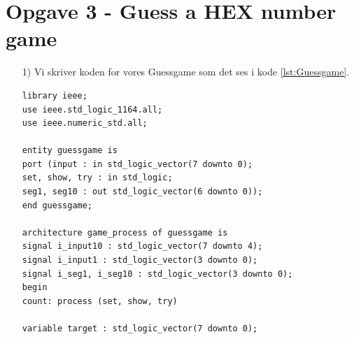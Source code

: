 
\section{Opgave 3 - Guess a HEX number game}
\begin{enumerate}
	\item[1)]
	Vi skriver koden for vores Guessgame som det ses i kode \ref{lst:Guessgame}.\\
	\begin{lstlisting}[caption={Behavioral style kode for Guessgame},label={lst:Guessgame}]
library ieee;
use ieee.std_logic_1164.all;
use ieee.numeric_std.all;

entity guessgame is 
port (input : in std_logic_vector(7 downto 0);
set, show, try : in std_logic;
seg1, seg10 : out std_logic_vector(6 downto 0));
end guessgame;

architecture game_process of guessgame is
signal i_input10 : std_logic_vector(7 downto 4);
signal i_input1 : std_logic_vector(3 downto 0);
signal i_seg1, i_seg10 : std_logic_vector(3 downto 0);
begin
count: process (set, show, try)

variable target : std_logic_vector(7 downto 0);


\end{lstlisting}
\end{enumerate}
